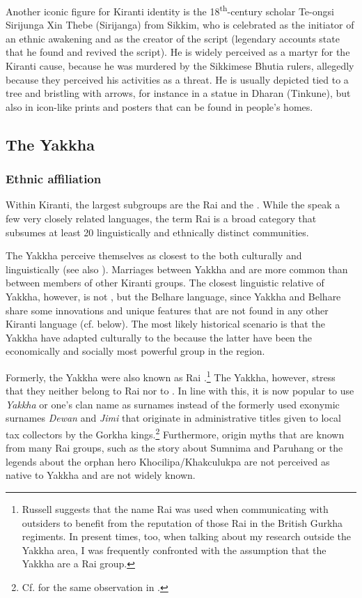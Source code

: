 Another iconic figure for Kiranti identity is the 18\textsuperscript{th}-century  scholar Te-ongsi Sirijunga Xin Thebe (Sirijanga) from Sikkim, who is celebrated as the initiator of an ethnic awakening and as the creator of the  script (legendary accounts state that he found and revived the script). He is widely perceived as a martyr for the Kiranti cause, because he was  murdered by the Sikkimese Bhutia rulers, allegedly because they perceived his activities as a threat. He is usually depicted tied to a tree and bristling with arrows, for instance in a statue in Dharan (Tinkune), but also in icon-like prints and posters that can be found in people's homes.


\subsection{The Yakkha}

\subsubsection{Ethnic affiliation}

Within Kiranti, the largest subgroups are the Rai and the . While the  speak a few very closely related languages, the term Rai is a broad category that subsumes at least 20 linguistically and ethnically distinct communities.  

The Yakkha perceive themselves as closest to the  both culturally and linguistically (see also \citet[90]{Russell1992_Yakha}). Marriages between Yakkha and  are more common than between members of other Kiranti groups. The closest linguistic relative of Yakkha, however, is not , but the Belhare language, since Yakkha and Belhare share some innovations and unique features that are not found in any other Kiranti language (cf.  below). The most likely historical scenario is that the Yakkha have adapted culturally to the  because the latter have been  the economically and socially most powerful group in the region. 

Formerly, the Yakkha were also known as Rai \citep[90]{Russell1992_Yakha}.\footnote{Russell suggests that the name Rai was used when communicating with outsiders to benefit from the reputation of those Rai in the British Gurkha regiments. In present times, too, when talking about my research outside the Yakkha area, I was frequently confronted with the assumption that the Yakkha are a Rai group.}  The Yakkha, however, stress that they neither belong to Rai nor to . In line with this, it is now popular to use \emph{Yakkha} or one's  clan name as surnames instead of the formerly used exonymic surnames \emph{Dewan} and \emph{Jimi} that originate in  administrative titles given to local tax collectors by the Gorkha kings.\footnote{Cf. \citet[8]{Doornenbal2009A-grammar} for the same observation in .} Furthermore,  origin myths that are known from many Rai groups, such as the story about Sumnima and Paruhang or the legends about the orphan hero Khocilipa/Khakculukpa \citep{Ebert2003Camling, Gaenszle2000Origins} are not perceived as native to Yakkha and are not widely known. 

